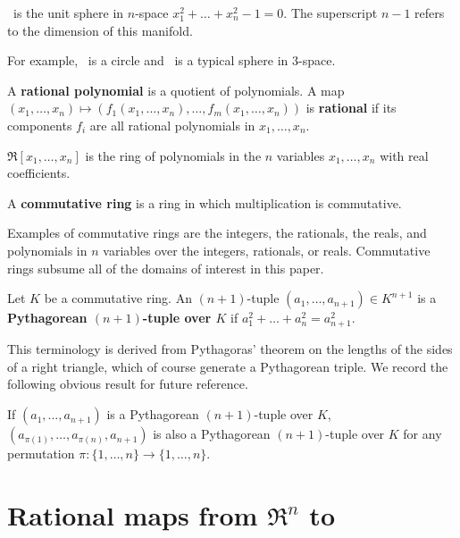 \begin{defn2}
\ is the unit sphere in $n$-space $x_1^2 + \ldots + x_{n}^2 - 1 = 0$.
The superscript $n-1$ refers to the dimension of this manifold.
\end{defn2}

\noindent For example, \ is a circle and \ is a typical
sphere in 3-space.

\begin{defn2}
A {\bf rational polynomial} is a quotient of polynomials.
A map 
$(x_1,\ldots,x_n) \mapsto (f_1 (x_1,\ldots,x_n),\ldots,f_m (x_1,\ldots,x_n))$
is {\bf rational} if 
its components $f_i$ are all rational polynomials in $x_1,\ldots,x_n$.
\end{defn2}

\begin{defn2}
$\Re[x_1,\ldots,x_n]$ is the ring of polynomials in the $n$ variables
$x_1,\ldots,x_n$ with real coefficients.
\end{defn2}

\begin{defn2}
A {\bf commutative ring} is a ring in which multiplication is commutative.
\end{defn2}
%
Examples of commutative rings are the integers, the rationals, the reals,
and polynomials in $n$ variables over the integers, rationals, or reals.
Commutative rings subsume all of the domains of interest in this paper.

\begin{defn2}
Let $K$ be a commutative ring.
An $(n+1)$-tuple $(a_1,\ldots,a_{n+1}) \in K^{n+1}$
is a {\bf Pythagorean $(n+1)$-tuple over $K$} 
if $a_1^2 + \ldots + a_n^2 = a_{n+1}^2$.
\end{defn2}
%
This terminology is derived from Pythagoras' theorem on the lengths
of the sides of a right triangle, which of course generate
a Pythagorean triple.
We record the following obvious result for future reference.

\begin{lemma}
\label{lem:perm}
If $(a_1,\ldots,a_{n+1})$ is a Pythagorean $(n+1)$-tuple over $K$,
$(a_{\pi(1)},\ldots,a_{\pi(n)},a_{n+1})$ is also a Pythagorean 
$(n+1)$-tuple over $K$ for any permutation 
$\pi : \{1,\ldots,n\} \rightarrow \{1,\ldots,n\}$.
\end{lemma}


\section{Rational maps from $\Re^{n}$ to }
\label{sec:setup}

